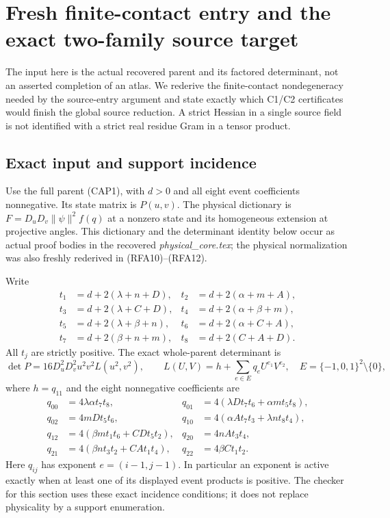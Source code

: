 \section{Fresh finite-contact entry and the exact two-family source target}
\label{sec:rederived-contact-entry}

The input here is the actual recovered parent and its factored determinant,
not an asserted completion of an atlas.  We rederive the finite-contact
nondegeneracy needed by the source-entry argument and state exactly which
C1/C2 certificates would finish the global source reduction.  A strict
Hessian in a single source field is not identified with a strict real
residue Gram in a tensor product.

\subsection{Exact input and support incidence}

Use the full parent (CAP1), with $d>0$ and all eight event coefficients
nonnegative.  Its state matrix is $P(u,v)$.  The physical dictionary is
$F=D_uD_v\|\psi\|^2 f(q)$ at a nonzero state and its homogeneous
extension at projective angles.  This dictionary and the determinant
identity below occur as actual proof bodies in the recovered
\emph{physical\_core.tex}; the physical normalization was also freshly
rederived in (RFA10)--(RFA12).

Write
\begin{align*}
t_1&=d+2(\lambda+n+D),&t_2&=d+2(\alpha+m+A),\\
t_3&=d+2(\lambda+C+D),&t_4&=d+2(\alpha+\beta+m),\\
t_5&=d+2(\lambda+\beta+n),&t_6&=d+2(\alpha+C+A),\\
t_7&=d+2(\beta+n+m),&t_8&=d+2(C+A+D).
\end{align*}
All $t_j$ are strictly positive.  The exact whole-parent determinant is
\[
\det P=16D_u^2D_v^2u^2v^2L(u^2,v^2),\qquad
L(U,V)=h+\sum_{e\in E}q_eU^{e_1}V^{e_2},
\quad E=\{-1,0,1\}^2\setminus\{0\},
\tag{SE1}
\]
where $h=q_{11}$ and the eight nonnegative coefficients are
\begin{align*}
q_{00}&=4\lambda\alpha t_7t_8,&
q_{01}&=4(\lambda Dt_7t_6+\alpha mt_5t_8),\\
q_{02}&=4mDt_5t_6,&
q_{10}&=4(\alpha At_7t_3+\lambda nt_8t_4),\\
q_{12}&=4(\beta mt_1t_6+CDt_5t_2),&
q_{20}&=4nAt_3t_4,\\
q_{21}&=4(\beta nt_3t_2+CAt_1t_4),&
q_{22}&=4\beta Ct_1t_2.
\end{align*}
Here $q_{ij}$ has exponent $e=(i-1,j-1)$.  In particular an exponent
is active exactly when at least one of its displayed event products is
positive.  The checker for this section uses these exact incidence
conditions; it does not replace physicality by a support enumeration.

